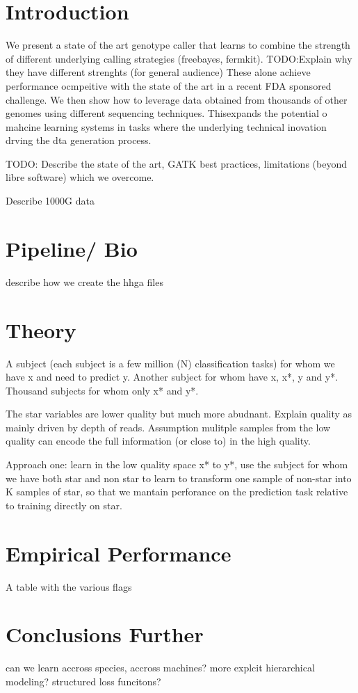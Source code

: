 \documentclass[11pt, a4paper]{article}
\title{} %
\author{NDP,EG, PD?}
\date{\today}
\begin{document}
\maketitle




\section{Introduction}

We present a state of the art genotype caller that learns to combine the strength of different underlying calling strategies (freebayes, fermkit).
TODO:Explain why they have different strenghts (for general audience) 
These alone achieve performance ocmpeitive with the state of the art in a recent FDA sponsored challenge.
We then show how to leverage data obtained from thousands of other genomes using different sequencing techniques. 
Thisexpands the potential o mahcine learning systems in tasks where the underlying technical inovation drving the dta generation process. 

TODO: Describe the state of the art, GATK best practices, limitations (beyond libre software) which we overcome.


Describe 1000G data  

\section{Pipeline/ Bio}

describe how we create the hhga files

\section{Theory}

A subject (each subject is  a few million (N) classification tasks) for whom we have  x and  need to predict y.
Another subject for whom have x,  x*,  y and  y*.
Thousand subjects for whom only x* and y*.

The star variables are lower quality but much more abudnant.
Explain quality as mainly driven by depth of reads.
Assumption mulitple samples from the low quality can encode the full information (or close to) in the high quality.

Approach one: learn in the low quality space x* to y*, use the subject for whom we have both star and non star to learn to transform one sample of non-star into K samples of star, so that we mantain perforance on the prediction task relative to training directly on star.


\section{Empirical Performance}

A table with the various flags

\section{Conclusions Further}

can we learn accross species, accross machines? more explcit hierarchical modeling? structured loss funcitons? 
\end{document}
